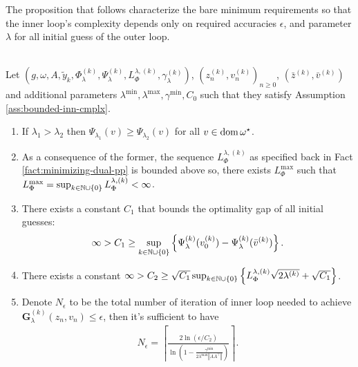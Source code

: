 \documentclass[12pt]{article}
\begin{document}
        \par
        The proposition that follows characterize the bare minimum requirements so that the inner loop's complexity depends only on required accuracies $\epsilon$, and parameter $\lambda$ for all initial guess of the outer loop. 
        \begin{proposition}\;\label{prop:inner-lp-cmplx}\\
            Let $\left(g, \omega, A, \tilde y_k, \Phi_\lambda^{(k)}, \Psi_\lambda^{(k)}, L^{\lambda, (k)}_{\Phi} ,\gamma_\lambda^{(k)}\right)$, $\left(z_n^{(k)}, v_{n}^{(k)}\right)_{n \ge 0}$, $\left(\bar z^{(k)}, \bar v^{(k)}\right)$ and additional parameters $\lambda^{\min}, \lambda^{\max}, \gamma^{\min}, C_0$ such that they satisfy Assumption \ref{ass:bounded-inn-cmplx}. 
            \begin{enumerate}[nosep]
                \item\label{prop:inner-lp-cmplx-result1} 
                If $\lambda_1 > \lambda_2$ then $\Psi_{\lambda_1}(v) \ge \Psi_{\lambda_2}(v)$ for all $v \in \operatorname{dom} \omega^\star$. 
                \item\label{prop:inner-lp-cmplx-result2}  As a consequence of the former, the sequence $L_\Phi^{\lambda, (k)}$ as specified back in Fact \ref{fact:minimizing-dual-pp} is bounded above so, there exists $L_\Phi^{\max}$ such that $L_\Phi^{\max} = \sup_{k \in \mathbb N \cup \{0\}}L_\Phi^{\lambda, (k)} < \infty$. 
                \item\label{prop:inner-lp-cmplx-result3} There exists a constant $C_1$ that bounds the optimality gap of all initial guesses: 
                \begin{align*}
                    \infty > C_1 \ge  \sup_{k \in \mathbb N \cup \{0\}}
                    \left\lbrace
                        \Psi_{\lambda}^{(k)}(v^{(k)}_0) - \Psi_\lambda^{(k)}(\bar v^{(k)})
                    \right\rbrace. 
                \end{align*}
                \item\label{prop:inner-lp-cmplx-result4} 
                There exists a constant $\infty > C_2 \ge \sqrt{C_1}\sup_{k \in \mathbb N \cup \{0\}}\left\lbrace L_\Phi^{\lambda, (k)}\sqrt{2\lambda^{(k)}} + \sqrt{C_1}\right\rbrace$. 
                \item\label{prop:inner-lp-cmplx-result5} 
                Denote $N_\epsilon$ to be the total number of iteration of inner loop needed to achieve $\mathbf G_\lambda^{(k)}(z_n, v_n) \le \epsilon$, then it's sufficient to have 
                \begin{align*}
                    N_{\epsilon} = \left\lceil 
                        \frac{2\ln(\epsilon/C_2)}{
                            \ln\left(
                                1 - \frac{\gamma^{\min}}{2\lambda^{\max}\left\Vert AA^\top\right\Vert}
                            \right)
                        }
                    \right\rceil. 
                \end{align*}
            \end{enumerate}

        \end{proposition}
\end{document}
